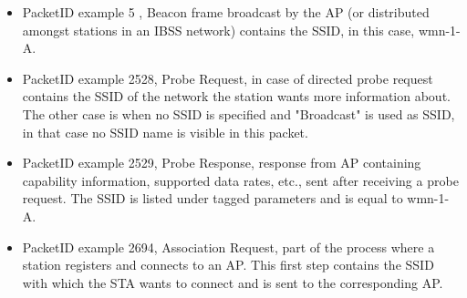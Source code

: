 \begin{itemize}
\item PacketID example 5   , Beacon frame broadcast by the AP (or distributed amongst stations in an IBSS network) contains the SSID, in this case, wmn-1-A.
\item PacketID example 2528, Probe Request, in case of directed probe request contains the SSID of the network the station wants more information about. The other case is when no SSID is specified and "Broadcast" is used as SSID, in that case no SSID name is visible in this packet.
\item PacketID example 2529, Probe Response, response from AP containing capability information, supported data rates, etc., sent after receiving a probe request. The SSID is listed under tagged parameters and is equal to wmn-1-A.
\item PacketID example 2694, Association Request, part of the process where a station registers and connects to an AP. This first step contains the SSID with which the STA wants to connect and is sent to the corresponding AP.
\end{itemize}
